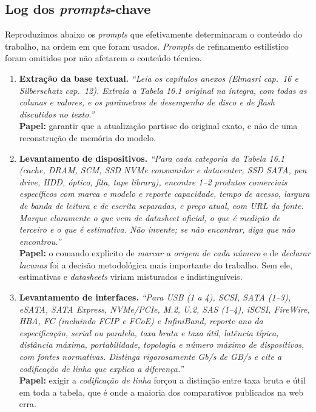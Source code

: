 \documentclass[11pt,a4paper]{article}
\begin{document}
\subsection{Log dos \emph{prompts}-chave}

Reproduzimos abaixo os \emph{prompts} que efetivamente determinaram o conteúdo do trabalho,
na ordem em que foram usados. \emph{Prompts} de refinamento estilístico foram omitidos por
não afetarem o conteúdo técnico.

\begin{enumerate}[label={\textbf{P\arabic*.}},leftmargin=*]

\item \textbf{Extração da base textual.} \emph{``Leia os capítulos anexos (Elmasri cap.~16 e
      Silberschatz cap.~12). Extraia a Tabela 16.1 original na íntegra, com todas as
      colunas e valores, e os parâmetros de desempenho de disco e de flash discutidos no
      texto.''}\\
      \textbf{Papel:} garantir que a atualização partisse do original exato, e não de uma
      reconstrução de memória do modelo.

\item \textbf{Levantamento de dispositivos.} \emph{``Para cada categoria da Tabela 16.1
      (cache, DRAM, SCM, SSD NVMe consumidor e datacenter, SSD SATA, pen drive, HDD, óptico,
      fita, tape library), encontre 1--2 produtos comerciais específicos com marca e modelo
      e reporte capacidade, tempo de acesso, largura de banda de leitura e de escrita
      separadas, e preço atual, com URL da fonte. Marque claramente o que vem de datasheet
      oficial, o que é medição de terceiro e o que é estimativa. Não invente; se não
      encontrar, diga que não encontrou.''}\\
      \textbf{Papel:} o comando explícito de \emph{marcar a origem de cada número} e de
      \emph{declarar lacunas} foi a decisão metodológica mais importante do trabalho. Sem
      ele, estimativas e \emph{datasheets} viriam misturados e indistinguíveis.

\item \textbf{Levantamento de interfaces.} \emph{``Para USB (1 a 4), SCSI, SATA (1--3),
      eSATA, SATA Express, NVMe/PCIe, M.2, U.2, SAS (1--4), iSCSI, FireWire, HBA, FC
      (incluindo FCIP e FCoE) e InfiniBand, reporte ano da especificação, serial ou
      paralela, taxa bruta e taxa útil, latência típica, distância máxima, portabilidade,
      topologia e número máximo de dispositivos, com fontes normativas. Distinga
      rigorosamente Gb/s de GB/s e cite a codificação de linha que explica a diferença.''}\\
      \textbf{Papel:} exigir a \emph{codificação de linha} forçou a distinção entre taxa
      bruta e útil em toda a tabela, que é onde a maioria dos comparativos publicados na
      web erra.


\end{enumerate}
\end{document}
